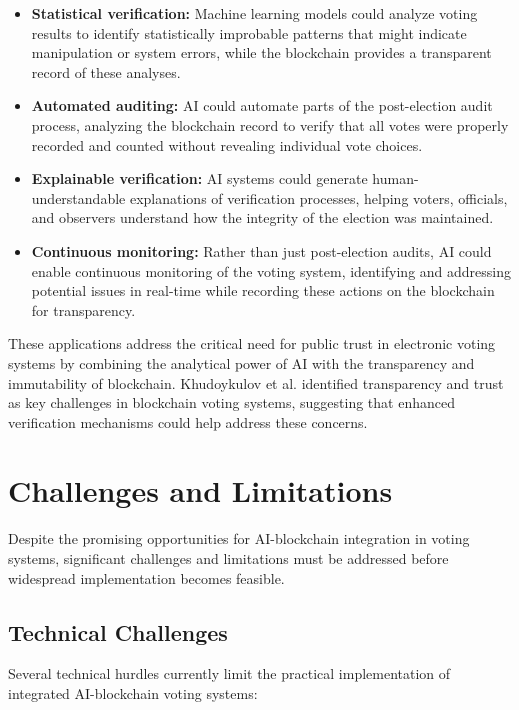 \documentclass[conference]{IEEEtran}
\begin{document}
\begin{itemize}
    \item \textbf{Statistical verification:} Machine learning models could analyze voting results to identify statistically improbable patterns that might indicate manipulation or system errors, while the blockchain provides a transparent record of these analyses.
    
    \item \textbf{Automated auditing:} AI could automate parts of the post-election audit process, analyzing the blockchain record to verify that all votes were properly recorded and counted without revealing individual vote choices.
    
    \item \textbf{Explainable verification:} AI systems could generate human-understandable explanations of verification processes, helping voters, officials, and observers understand how the integrity of the election was maintained.
    
    \item \textbf{Continuous monitoring:} Rather than just post-election audits, AI could enable continuous monitoring of the voting system, identifying and addressing potential issues in real-time while recording these actions on the blockchain for transparency.
\end{itemize}

These applications address the critical need for public trust in electronic voting systems by combining the analytical power of AI with the transparency and immutability of blockchain. Khudoykulov et al. \cite{b1} identified transparency and trust as key challenges in blockchain voting systems, suggesting that enhanced verification mechanisms could help address these concerns.

\section{Challenges and Limitations}
Despite the promising opportunities for AI-blockchain integration in voting systems, significant challenges and limitations must be addressed before widespread implementation becomes feasible.

\subsection{Technical Challenges}
Several technical hurdles currently limit the practical implementation of integrated AI-blockchain voting systems:
\end{document}

